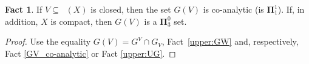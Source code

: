 \documentclass{amsart}
\theoremstyle{definition}
\newtheorem{fact}[thm]{Fact}
\newcommand{\cC}{\mathcal{C}}
\newcommand{\bs}{\boldsymbol{\Sigma}}
\newcommand{\bp}{\boldsymbol{\Pi}}
\newcommand{\bP}{\boldsymbol{\Pi}}
\renewcommand{\phi}{\varphi}
\DeclareMathOperator{\MT}{\mathcal{M}_{\mathit T} }
\begin{document}
\begin{fact} \label{upper:GV}
If $V\subseteq \MT(X)$ is closed, then  the set $G(V)$ is co-analytic (is $\bp^1_1$). If, in addition, $X$ is
 compact, then $G(V)$ is a $\bP^0_3$ set.
\end{fact}

\begin{proof}
Use the equality $G(V)=G^V \cap G_V$, Fact~\ref{upper:GW} and, respectively, Fact \ref{GV_co-analytic} or Fact \ref{upper:UG}.
\end{proof}

%
%









\end{document}
